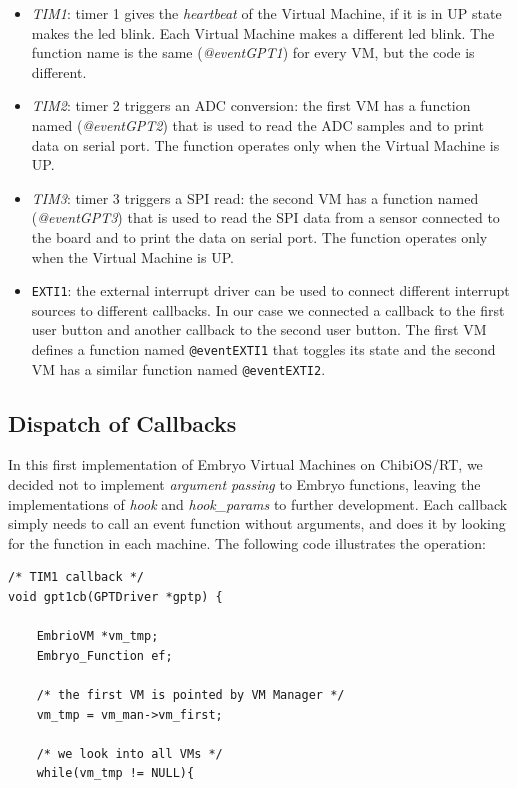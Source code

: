 \documentclass[a4paper,10pt]{article}
\begin{document}
\begin{multicols}{2}
\begin{itemize}
\item \textit{TIM1}: timer 1 gives the \textit{heartbeat} of the Virtual Machine, if it is in UP state makes the led  blink. Each Virtual Machine makes a different led blink. The function name is the same (\textit{@eventGPT1}) for every VM, but the code is different.
\item \textit{TIM2}: timer 2 triggers an ADC conversion: the first VM has a function named (\textit{@eventGPT2}) that is used to read the ADC samples and to print data on serial port. The function operates only when the Virtual Machine is UP.
\item \textit{TIM3}: timer 3 triggers a SPI read: the second VM has a function named (\textit{@eventGPT3}) that is used to read the SPI data from a sensor connected to the board and to print the data on serial port. The function operates only when the Virtual Machine is UP.
\item \texttt{EXTI1}: the external interrupt driver can be used to connect different interrupt sources to different callbacks. In our case we connected a callback to the first user button and another callback to the second user button. The first VM defines a function named \texttt{@eventEXTI1} that toggles its state and the second VM has a similar function named \texttt{@eventEXTI2}.
\end{itemize}

\subsection{Dispatch of Callbacks}
In this first implementation of Embryo Virtual Machines on ChibiOS/RT, we decided not to implement \textit{argument passing} to Embryo functions, leaving the implementations of \textit{hook} and \textit{hook\_params} to further development.\newline
Each callback simply needs to call an event function without arguments, and does it by looking for the function in each machine. The following code illustrates the operation:
\medskip
\lstset{language=C}
\begin{lstlisting}[caption={Callback looking for a function in VMs}]
/* TIM1 callback */
void gpt1cb(GPTDriver *gptp) {

	EmbrioVM *vm_tmp;
	Embryo_Function ef;
	
	/* the first VM is pointed by VM Manager */
	vm_tmp = vm_man->vm_first;
	
	/* we look into all VMs */
	while(vm_tmp != NULL){
		

\end{lstlisting}
\end{multicols}
\end{document}
